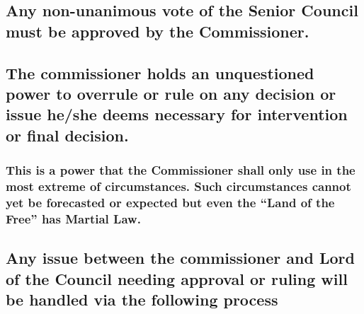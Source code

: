 \documentclass[]{book}
\begin{document}
\hypertarget{any-non-unanimous-vote-of-the-senior-council-must-be-approved-by-the-commissioner.}{%
\subsection{Any non-unanimous vote of the Senior Council must be approved by the Commissioner.}\label{any-non-unanimous-vote-of-the-senior-council-must-be-approved-by-the-commissioner.}}

\hypertarget{the-commissioner-holds-an-unquestioned-power-to-overrule-or-rule-on-any-decision-or-issue-heshe-deems-necessary-for-intervention-or-final-decision.}{%
\subsection{The commissioner holds an unquestioned power to overrule or rule on any decision or issue he/she deems necessary for intervention or final decision.}\label{the-commissioner-holds-an-unquestioned-power-to-overrule-or-rule-on-any-decision-or-issue-heshe-deems-necessary-for-intervention-or-final-decision.}}

\hypertarget{this-is-a-power-that-the-commissioner-shall-only-use-in-the-most-extreme-of-circumstances.-such-circumstances-cannot-yet-be-forecasted-or-expected-but-even-the-land-of-the-free-has-martial-law.}{%
\subsubsection{This is a power that the Commissioner shall only use in the most extreme of circumstances. Such circumstances cannot yet be forecasted or expected but even the ``Land of the Free'' has Martial Law.}\label{this-is-a-power-that-the-commissioner-shall-only-use-in-the-most-extreme-of-circumstances.-such-circumstances-cannot-yet-be-forecasted-or-expected-but-even-the-land-of-the-free-has-martial-law.}}

\hypertarget{any-issue-between-the-commissioner-and-lord-of-the-council-needing-approval-or-ruling-will-be-handled-via-the-following-process}{%
\subsection{Any issue between the commissioner and Lord of the Council needing approval or ruling will be handled via the following process}\label{any-issue-between-the-commissioner-and-lord-of-the-council-needing-approval-or-ruling-will-be-handled-via-the-following-process}}
\end{document}
